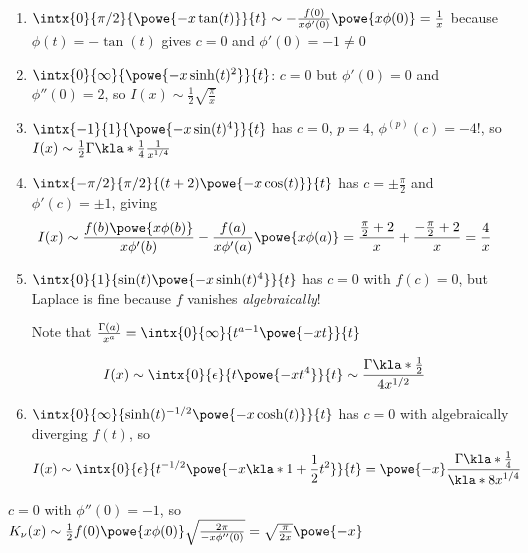 \documentclass[english, parskip=full]{scrbook}
\newcommand{\note}[1]{\begin{tcolorbox}[colback=colorbackgroundnote,colframe=colornote, breakable,enhanced]#1\end{tcolorbox}}
\newcommand{\example}[3]{\begin{tcolorbox}[colback=colorbackgroundexample,colframe=colorexample, breakable,enhanced,title={\textbf{#1}: #2.}]#3\end{tcolorbox}}
\begin{document}
\example{Several examples}{}{\begin{enumerate}
\item $\intx{0}{\pi/2}{\powe{-x\tan(t)}}{t} \sim -\frac{f(0)}{x\phi'(0)} \powe{x\phi(0)} = \frac{1}{x}$ because $\phi(t) = -\tan(t)$ gives $c=0$ and $\phi'(0)=-1 \neq 0$
\item $\intx{0}{\infty}{\powe{-x\sinh(t)^2}}{t}$: $c=0$ but $\phi'(0)=0$ and $\phi''(0) = 2$, so $I(x)\sim \frac{1}{2}\sqrt{\frac{\pi}{x}}$
\item $\intx{-1}{1}{\powe{-x\sin(t)^4}}{t}$ has $c=0$, $p=4$, $\phi^{(p)}(c) = -4!$, so $I(x) \sim \frac{1}{2} \Gamma\kla*{\frac{1}{4}} \frac{1}{x^{1/4}}$
\item $\intx{-\pi/2}{\pi/2}{(t+2) \powe{-x\cos(t)}}{t}$ has $c=\pm \frac{\pi}{2}$ and $\phi'(c) = \pm 1$, giving \begin{align}
I(x)&\sim \frac{f(b) \powe{x\phi(b)}}{x\phi'(b)} - \frac{f(a)}{x\phi'(a)} \powe{x\phi(a)} = \frac{\frac{\pi}{2} + 2}{x} + \frac{-\frac{\pi}{2} + 2}{x} = \frac{4}{x}
\end{align}
\item $\intx{0}{1}{\sin(t) \powe{-x\sinh(t)^4}}{t}$ has $c=0$ with $f(c)=0$, but Laplace is fine because $f$ vanishes \emph{algebraically}!
\note{Note that $\frac{\Gamma(a)}{x^a} = \intx{0}{\infty}{t^{a-1} \powe{-xt}}{t}$}
\begin{align}
I(x) &\sim \intx{0}{\epsilon}{t \powe{-xt^4}}{t} \sim \frac{\Gamma\kla*{\frac{1}{2}}}{4x^{1/2}}
\end{align}
\item $\intx{0}{\infty}{\sinh(t)^{-1/2} \powe{-x\cosh(t)}}{t}$ has $c=0$ with algebraically diverging $f(t)$, so \begin{align}
I(x) &\sim \intx{0}{\epsilon}{t^{-1/2} \powe{-x\kla*{1 + \frac{1}{2}t^2}}}{t} = \powe{-x} \frac{\Gamma\kla*{\frac{1}{4}}}{\kla*{8x}^{1/4}}
\end{align}
\end{enumerate}
}
\example{Modified Bessel function of second kind}{$K_\nu(x) = \intx{0}{\infty}{\powe{-x\cosh(t)} \cosh(\nu t)}{t}$ for $x>0$}{$c=0$ with $\phi''(0)=-1$, so $K_\nu(x) \sim \frac{1}{2} f(0) \powe{x\phi(0)} \sqrt{\frac{2\pi}{-x\phi''(0)}} = \sqrt{\frac{\pi}{2x}}\powe{-x}$
}
\end{document}
